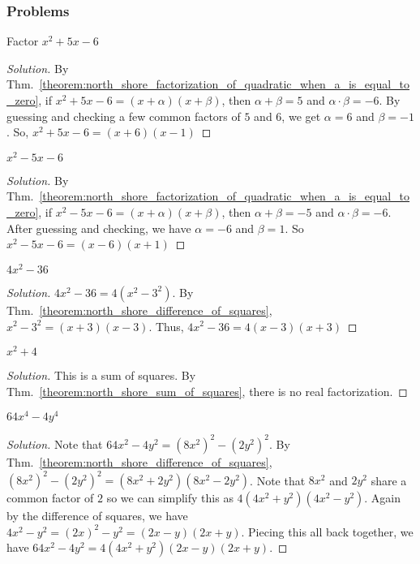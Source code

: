 \documentclass[crop=false,class=article,oneside]{standalone}
\begin{document}
        \subsubsection{Problems}
        \begin{problem}
        Factor $x^{2}+5x-6$
        \end{problem}
        \begin{proof}[Solution]
        By Thm.~\ref{theorem:north_shore_factorization_of_quadratic_when_a_is_equal_to_zero}, if $x^{2}+5x-6=(x+\alpha)(x+\beta)$, then $\alpha+\beta=5$ and $\alpha\cdot\beta=-6$. By guessing and checking a few common factors of $5$ and $6$, we get $\alpha=6$ and $\beta=-1$. So, $x^{2}+5x-6=(x+6)(x-1)$
        \end{proof}
        \begin{problem}
        $x^{2}-5x-6$
        \end{problem}
        \begin{proof}[Solution]
        By Thm.~\ref{theorem:north_shore_factorization_of_quadratic_when_a_is_equal_to_zero}, if $x^{2}-5x-6=(x+\alpha)(x+\beta)$, then $\alpha+\beta=-5$ and $\alpha\cdot\beta=-6$. After guessing and checking, we have $\alpha=-6$ and $\beta=1$. So $x^{2}-5x-6=(x-6)(x+1)$
        \end{proof}
        \begin{problem}
        $4x^{2}-36$
        \end{problem}
        \begin{proof}[Solution]
        $4x^{2}-36=4(x^{2}-3^{2})$. By Thm.~\ref{theorem:north_shore_difference_of_squares}, $x^{2}-3^{2}=(x+3)(x-3)$. Thus, $4x^{2}-36=4(x-3)(x+3)$
        \end{proof}
        \begin{problem}
        $x^{2}+4$
        \end{problem}
        \begin{proof}[Solution]
        This is a sum of squares. By Thm.~\ref{theorem:north_shore_sum_of_squares}, there is no real factorization.
        \end{proof}
        \begin{problem}
        $64x^{4}-4y^{4}$
        \end{problem}
        \begin{proof}[Solution]
        Note that $64x^{2}-4y^{2}=(8x^{2})^{2}-(2y^{2})^{2}$. By Thm.~\ref{theorem:north_shore_difference_of_squares}, $(8x^{2})^{2}-(2y^{2})^{2}=(8x^{2}+2y^{2})(8x^{2}-2y^{2})$. Note that $8x^{2}$ and $2y^{2}$ share a common factor of $2$ so we can simplify this as $4(4x^{2}+y^{2})(4x^{2}-y^{2})$. Again by the difference of squares, we have $4x^{2}-y^{2}=(2x)^{2}-y^{2}=(2x-y)(2x+y)$. Piecing this all back together, we have $64x^{2}-4y^{2}=4(4x^{2}+y^{2})(2x-y)(2x+y)$.
        \end{proof}
\end{document}
